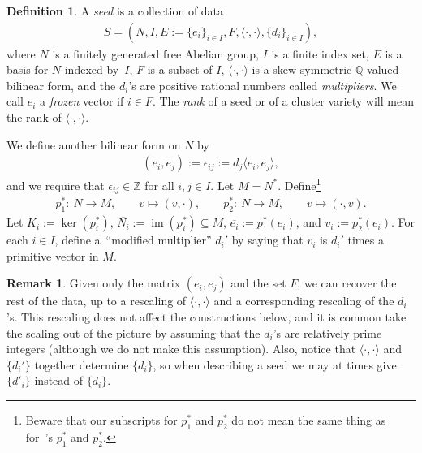 \documentclass[10pt,a4paper]{amsart}
\numberwithin{equation}{section}
\numberwithin{figure}{section}
\numberwithin{table}{section}
\DeclareMathOperator{\im}{im}
\let\?=\overline
\let\bb=\mathbb
\let\rar=\rightarrow
\theoremstyle{definition}
\newtheorem{dfn}[thm]{Definition}
\newtheorem{rmk}[thm]{Remark}
\begin{document}
\begin{dfn}A {\it seed} is a collection of data
\begin{gather*} S=(N,I,E:=\{e_i\}_{i\in I},F,\langle\cdot,\cdot\rangle,\{d_i\}_{i\in I}),\end{gather*}
where $N$ is a finitely generated free Abelian group, $I$ is a finite index set, $E$ is a basis for $N$ indexed by~$I$, $F$ is a subset of $I$, $\langle \cdot,\cdot\rangle$ is a skew-symmetric $\bb{Q}$-valued bilinear form, and the $d_i$'s are positive rational numbers called {\it multipliers}. We call $e_i$ a {\it frozen} vector if $i \in F$. The {\it rank} of a seed or of a cluster variety will mean the rank of $\langle \cdot, \cdot \rangle$.

We define another bilinear form on $N$ by
\begin{gather*} (e_i,e_j):=\epsilon_{ij}:=d_j\langle e_i,e_j \rangle,\end{gather*} and we require that $\epsilon_{ij}\in \bb{Z}$ for all $i,j\in I$.
 Let $M=N^*$. Define\footnote{Beware that our subscripts for $p_1^*$ and $p_2^*$ do not mean the same thing as for~\cite{GHK3}'s $p_1^*$ and $p_2^*$.}
 \begin{gather*} p_1^*\colon \ N\rar M,\qquad v\mapsto (v,\cdot), \qquad p_2^*\colon \ N\rar M,\qquad v\mapsto (\cdot,v).
 \end{gather*} Let $K_i:= \ker (p_i^*)$, $\?{N_i} := \im(p_i^*)\subseteq M$, $\?{e_i}:=p_1^*(e_i)$, and $v_i:=p_2^*(e_i)$. For each $i\in I$, define a~``modified multiplier'' $d_i'$ by saying that $v_i$ is $d_i'$ times a primitive vector in $M$.
\end{dfn}

\begin{rmk}\label{determined}Given only the matrix $(e_i,e_j)$ and the set $F$, we can recover the rest of the data, up to a rescaling of $\langle \cdot,\cdot\rangle$ and a corresponding rescaling of the $d_i$'s. This rescaling does not affect the constructions below, and it is common take the scaling out of the picture by assuming that the $d_i$'s are relatively prime integers (although we do not make this assumption). Also, notice that $\langle\cdot,\cdot\rangle$ and $\{d_i'\}$ together determine $\{d_i\}$, so when describing a seed we may at times give $\{d'_i\}$ instead of $\{d_i\}$.
\end{rmk}
\end{document}
